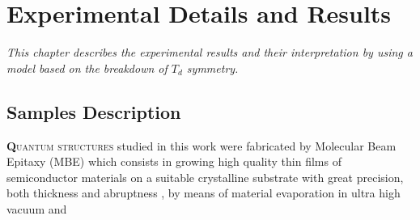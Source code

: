 \chapter{Experimental Details and Results}
\label{chap:experimentals-details-and-results}
\textit{This chapter describes the experimental results and their interpretation by using a model based on the breakdown of $T_d$ symmetry.}
\vfill
\minitoc
\newpage

\section{Samples Description}
\label{sec:chapter-3-section-samples-description}
\vspace{-10mm}
\lettrine[lines=3, lraise=.1, nindent=0mm, slope=0mm]{\textbf{Q}}{uantum structures} 
studied in this work were fabricated by Molecular Beam Epitaxy (MBE) which consists in growing high quality thin films of semiconductor materials on a suitable crystalline substrate  with great precision, both thickness and abruptness \cite{orton2015molecular}, by means of material evaporation in ultra high vacuum and 
